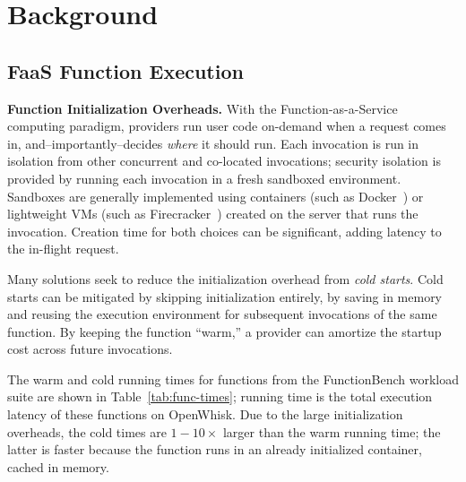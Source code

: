 
\section{Background}
\label{sec:background}

\subsection{FaaS Function Execution} %

\noindent \textbf{Function Initialization Overheads.}
With the Function-as-a-Service computing paradigm, providers run user code on-demand when a request comes in, and--importantly--decides \emph{where} it should run. 
Each invocation is run in isolation from other concurrent and co-located invocations; security isolation is provided by running each invocation in a fresh sandboxed environment. 
Sandboxes are generally implemented using containers (such as Docker~\cite{docker-main}) or lightweight VMs (such as Firecracker~\cite{firecracker-nsdi20}) created on the server that runs the invocation.
Creation time for both choices can be significant, adding latency to the in-flight request. 

Many solutions seek to reduce the initialization overhead from \emph{cold starts}.
Cold starts can be mitigated by skipping initialization entirely, by saving in memory and reusing the execution environment for subsequent invocations of the same function. 
By keeping the function ``warm,'' a provider can amortize the startup cost across future invocations. 

The warm and cold running times for functions from the FunctionBench \cite{kim_functionbench_2019} workload suite are shown in Table~\ref{tab:func-times};
running time is the total execution latency of these functions on OpenWhisk.
Due to the large initialization overheads, the cold times are $1-10\times$ larger than the warm running time; the latter is faster because the function runs in an already initialized container, cached in memory. 

